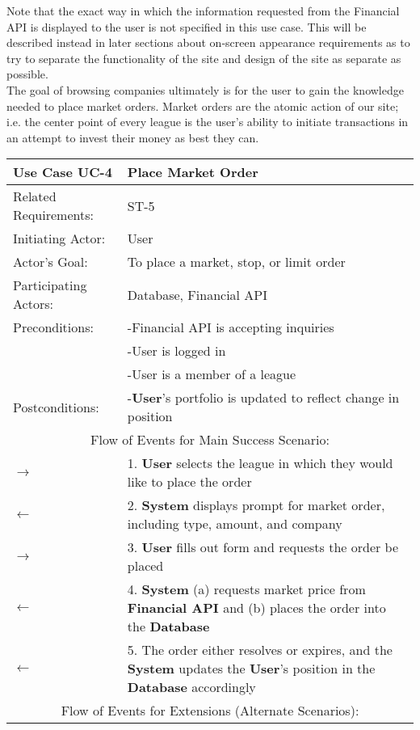 Note that the exact way in which the information requested from the Financial API is displayed to the user is not specified in this use case. This will be described instead in later sections about on-screen appearance requirements as to try to separate the functionality of the site and design of the site as separate as possible. \\

The goal of browsing companies ultimately is for the user to gain the knowledge needed to place market orders. Market orders are the atomic action of our site; i.e. the center point of every league is the user's ability to initiate transactions in an attempt to invest their money as best they can. \\

\begin{centering}
\label{UC-4}
\renewcommand\arraystretch{1.3} %
\begin{longtable}{|p{1.2in} p{5in}|}
\hline

\bfseries{\color{color1}Use Case UC-4} & \bfseries{\color{color1}Place Market Order} \\
\hline
Related Requirements: & ST-5 \\ 
Initiating Actor:     & User \\
Actor's Goal:         & To place a market, stop, or limit order \\
Participating Actors:  & Database, Financial API \\
Preconditions:        & -Financial API is accepting inquiries \\
 & -User is logged in \\
 & -User is a member of a league \\
Postconditions:       & -\textbf{User}'s portfolio is updated to reflect change in position \\
\hline
\multicolumn{2}{|c|}{\color{color1}Flow of Events for Main Success Scenario:}\\
\hline
$\rightarrow$ & 1. \textbf{User} selects the league in which they would like to place the order \\
$\leftarrow$ & 2. \textbf{System} displays prompt for market order, including type, amount, and company \\
$\rightarrow$ & 3. \textbf{User} fills out form and requests the order be placed \\
$\leftarrow$ & 4. \textbf{System} (a) requests market price from \textbf{Financial API} and (b) places the order into the \textbf{Database} \\
$\leftarrow$ & 5. The order either resolves or expires, and the \textbf{System} updates the \textbf{User}'s position in the \textbf{Database} accordingly \\
\hline
\multicolumn{2}{|c|}{\color{color1}Flow of Events for Extensions (Alternate Scenarios):} \\
\hline


\end{longtable}
\end{centering}
